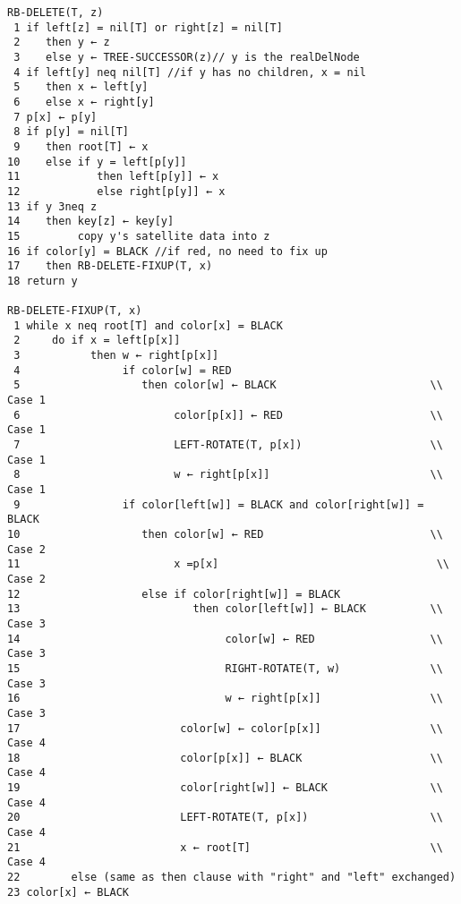 \documentclass{article}
\begin{document}
\begin{verbatim}
RB-DELETE(T, z)
 1 if left[z] = nil[T] or right[z] = nil[T]
 2    then y ← z
 3    else y ← TREE-SUCCESSOR(z)// y is the realDelNode
 4 if left[y] neq nil[T] //if y has no children, x = nil
 5    then x ← left[y]
 6    else x ← right[y]
 7 p[x] ← p[y]
 8 if p[y] = nil[T]
 9    then root[T] ← x
10    else if y = left[p[y]]
11            then left[p[y]] ← x
12            else right[p[y]] ← x
13 if y 3neq z
14    then key[z] ← key[y]
15         copy y's satellite data into z
16 if color[y] = BLACK //if red, no need to fix up
17    then RB-DELETE-FIXUP(T, x)
18 return y

RB-DELETE-FIXUP(T, x)
 1 while x neq root[T] and color[x] = BLACK
 2     do if x = left[p[x]]
 3           then w ← right[p[x]]
 4                if color[w] = RED
 5                   then color[w] ← BLACK                        \\  Case 1
 6                        color[p[x]] ← RED                       \\  Case 1
 7                        LEFT-ROTATE(T, p[x])                    \\  Case 1
 8                        w ← right[p[x]]                         \\  Case 1
 9                if color[left[w]] = BLACK and color[right[w]] = BLACK
10                   then color[w] ← RED                          \\  Case 2
11                        x =p[x]                                  \\  Case 2
12                   else if color[right[w]] = BLACK
13                           then color[left[w]] ← BLACK          \\  Case 3
14                                color[w] ← RED                  \\  Case 3
15                                RIGHT-ROTATE(T, w)              \\  Case 3
16                                w ← right[p[x]]                 \\  Case 3
17                         color[w] ← color[p[x]]                 \\  Case 4
18                         color[p[x]] ← BLACK                    \\  Case 4
19                         color[right[w]] ← BLACK                \\  Case 4
20                         LEFT-ROTATE(T, p[x])                   \\  Case 4
21                         x ← root[T]                            \\  Case 4
22        else (same as then clause with "right" and "left" exchanged)
23 color[x] ← BLACK
\end{verbatim}
\end{document}
